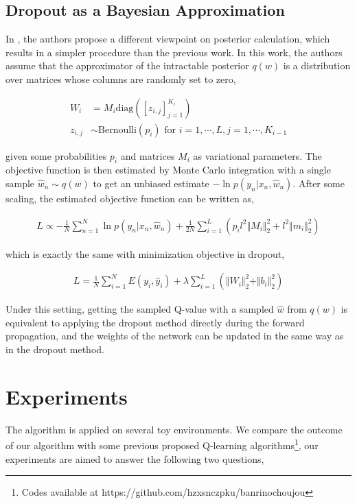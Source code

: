 \documentclass[a4paper,12pt]{article}
\begin{document}
\subsection{Dropout as a Bayesian Approximation}
In \cite{Dropout}, the authors propose a different viewpoint on posterior calculation, which results in a simpler procedure than the previous work. In this work, the authors assume that the approximator of the intractable posterior $q(w)$ is a distribution over matrices whose columns are randomly set to zero, 

\begin{equation}
\begin{aligned}
W_i&=M_i\textrm{diag}([z_{i,j}]_{j=1}^{K_i})\\
z_{i,j} &\sim \textrm{Bernoulli}(p_i) \textrm{ for } i=1, \cdots, L, j = 1,\cdots, K_{i-1}
\end{aligned}
\end{equation}

given some probabilities $p_i$ and matrices $M_i$ as variational parameters. The objective function is then estimated by Monte Carlo integration with a single sample $\hat{w}_n \sim q(w)$ to get an unbiased estimate $-\ln p(y_n |x_n , \hat{w}_n)$. After some scaling, the estimated objective function can be written as, 

\begin{equation}
\begin{aligned}
L \propto -\frac{1}{N}\sum_{n=1}^N\ln p(y_n|x_n,\hat{w}_n) + \frac{1}{2N}\sum_{i=1}^L(p_il^2\Vert M_i\Vert_2^2 + l^2\Vert m_i\Vert_2^2)
\end{aligned}
\end{equation}

which is exactly the same with minimization objective in dropout, 

\begin{equation}
\begin{aligned}
L=\frac{1}{N}\sum_{i=1}^N E(y_i,\hat{y}_i)+ \lambda\sum_{i=1}^L(\Vert W_i \Vert_2^2 + \Vert b_i\Vert_2^2) 
\end{aligned}
\end{equation}

Under this setting, getting the sampled Q-value with a sampled $\hat{w}$ from $q(w)$ is equivalent to applying the dropout method directly during the forward propagation, and the weights of the network can be updated in the same way as in the dropout method. 

\section{Experiments}
The algorithm is applied on several toy environments. We compare the outcome of our algorithm with some previous proposed Q-learning algorithms\footnote{Codes available at https://github.com/hzxsnczpku/banrinochoujou}, our experiments are aimed to answer the following two questions, 
\end{document}
